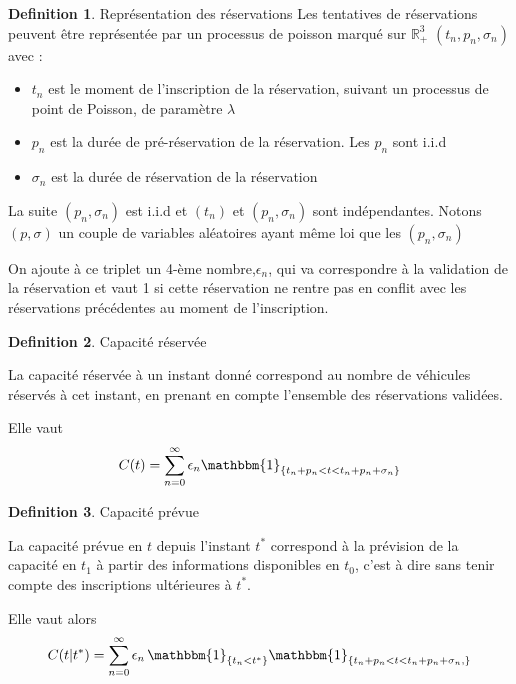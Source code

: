 \documentclass[12pt,a4paper]{article}
\newcommand{\R}{\mathbb{R}}
\newcommand{\1}[1]{\mathbbm{1}_{\{#1\}} }
\theoremstyle{definition}
\newtheorem{definition}{Definition}
\begin{document}
{\begin{definition}{Représentation des réservations}
Les tentatives de réservations peuvent être représentée par un processus de poisson marqué sur $\R_+^3$ $(t_n,p_n,\sigma_n)$ avec :
\begin{itemize}
\item $t_n$ est le moment de l'inscription de la réservation, suivant un processus de point de Poisson, de paramètre $\lambda$
\item $p_n$ est la durée de pré-réservation de la réservation. Les $p_n$ sont i.i.d 
\item $\sigma_n$ est la durée de réservation de la réservation
\end{itemize}


La suite $(p_n,\sigma_n)$ est i.i.d et $(t_n)$ et $(p_n,\sigma_n)$ sont indépendantes. Notons $(p,\sigma)$ un couple de variables aléatoires ayant même loi que les  $(p_n,\sigma_n)$

On ajoute à ce triplet un 4-ème nombre,$\epsilon_n$, qui va correspondre à la validation de la réservation et vaut 1 si cette réservation ne rentre pas en conflit avec les réservations précédentes au moment de l'inscription.
\end{definition}

\begin{definition}{Capacité réservée}

La capacité réservée à un instant donné correspond au nombre de véhicules réservés à cet instant, en prenant en compte l'ensemble des réservations validées.

Elle vaut
\begin{equation}
C(t) = \sum_{n=0}^{\infty} \epsilon_n \mathbbm{1}_{\{t_n+p_n<t<t_n+p_n+\sigma_n\}}
\end{equation}

\end{definition}



\begin{definition}{Capacité prévue}

La capacité prévue en $t$ depuis l'instant $t^{*}$ correspond à la prévision de la capacité en $t_1$ à partir des informations disponibles en $t_0$, c'est à dire sans tenir compte des inscriptions ultérieures à $t^*$.

Elle vaut alors
\begin{equation}
C(t|t^{*}) = \sum_{n=0}^{\infty} \epsilon_n\,\1{t_n<t^*}\mathbbm{1}_{\{t_n+p_n<t<t_n+p_n+\sigma_n,\}}
\end{equation}

\end{definition}


}
\end{document}
